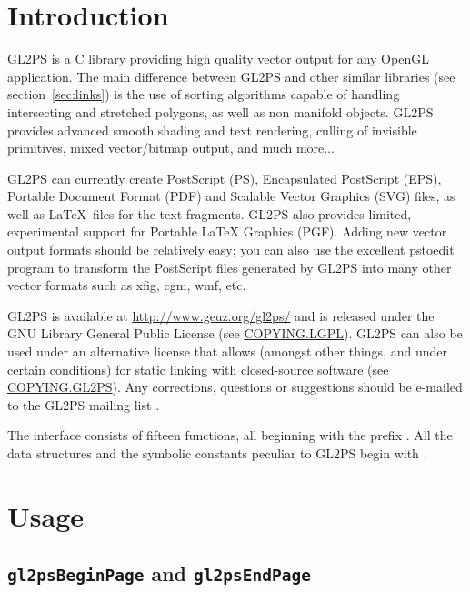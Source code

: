 \tableofcontents

\section{Introduction}

GL2PS is a C library providing high quality vector output for any OpenGL
application. The main difference between GL2PS and other similar libraries
(see section~\ref{sec:links}) is the use of sorting algorithms capable of
handling intersecting and stretched polygons, as well as non manifold
objects. GL2PS provides advanced smooth shading and text rendering, culling
of invisible primitives, mixed vector/bitmap output, and much more...

GL2PS can currently create PostScript (PS), Encapsulated PostScript
(EPS), Portable Document Format (PDF) and Scalable Vector Graphics (SVG)
files, as well as \LaTeX\ files for the text fragments. GL2PS also
provides limited, experimental support for Portable LaTeX Graphics
(PGF). Adding new vector output formats should be relatively easy; you
can also use the excellent \href{http://www.pstoedit.net}{pstoedit}
program to transform the PostScript files generated by GL2PS into many
other vector formats such as xfig, cgm, wmf, etc.

GL2PS is available at \url{http://www.geuz.org/gl2ps/} and is released under
the GNU Library General Public License (see
\href{http://www.geuz.org/gl2ps/COPYING.LGPL}{COPYING.LGPL}). GL2PS can also
be used under an alternative license that allows (amongst other things, and
under certain conditions) for static linking with closed-source software
(see \href{http://www.geuz.org/gl2ps/COPYING.GL2PS}{COPYING.GL2PS}). Any
corrections, questions or suggestions should be e-mailed to the GL2PS
mailing list .

The interface consists of fifteen functions, all beginning with the
prefix . All the data structures and the symbolic constants
peculiar to GL2PS begin with .

\section{Usage}


\subsection{\texttt{gl2psBeginPage} and \texttt{gl2psEndPage}}
\label{sec:gl2psBeginPage}

